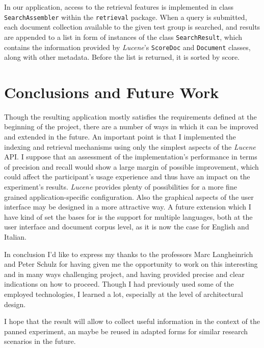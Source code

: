 \documentclass[a4paper]{usiinfbachelorproject}
\begin{document}
In our application, access to the retrieval features is implemented in class \texttt{SearchAssembler} within the \texttt{retrieval} package.
When a query is submitted, each document collection available to the given test group is searched, and results are appended to a
list in form of instances of the class \texttt{SearchResult}, which contains the information provided by \emph{Lucene}'s 
\texttt{ScoreDoc} and \texttt{Document} classes, along with other metadata. Before the list is returned, it is sorted
by score.

\newpage

\section{\textbf{Conclusions and Future Work}} \label{sec:futureWork}

Though the resulting application mostly satisfies the requirements defined at the
 beginning of the project, there are a number of ways in which it can be improved and extended in the future. An important
point is that I implemented the indexing and retrieval mechanisms using only the simplest aspects of the
\emph{Lucene} API. I suppose that an assessment of the implementation's performance in terms of
precision and recall would show a large margin of possible improvement, which could affect the participant's 
usage experience and thus have an impact on the experiment's results. \emph{Lucene} provides plenty of possibilities for
a more fine grained application-specific configuration. Also the graphical aspects of the user interface may be
designed in a more attractive way.
A future extension which I have kind of set the bases for is the support for multiple languages, both at the
user interface and document corpus level, as it is now the case for English and Italian.

In conclusion I'd like to express my thanks to the professors Marc Langheinrich and Peter Schulz
for having given me the opportunity to work on this interesting and in many ways challenging project, 
and having provided precise and clear indications on how to proceed.
Though I had previously used some of the employed technologies, I learned a lot, especially at the level of architectural design.

I hope that the result will allow to collect useful information in the context of the panned experiment,
an maybe be reused in adapted forms for similar research scenarios in the future.
\end{document}
